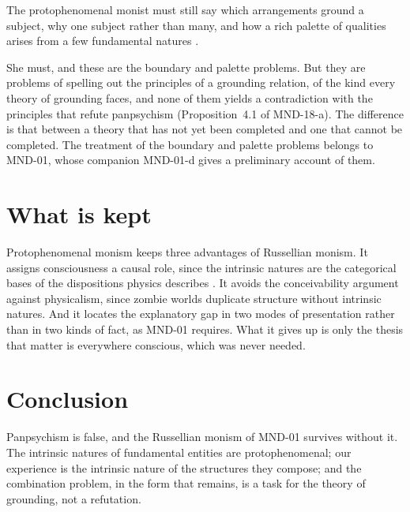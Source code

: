 \documentclass{situationist-preprint}
\begin{document}
\begin{objection}
The protophenomenal monist must still say which arrangements ground a subject, why one subject rather than many, and how a rich palette of qualities arises from a few fundamental natures \citep{Chalmers2017,Coleman2014}.
\end{objection}

\begin{reply}
She must, and these are the boundary and palette problems. But they are problems of spelling out the principles of a grounding relation, of the kind every theory of grounding faces, and none of them yields a contradiction with the principles that refute panpsychism (Proposition~4.1 of MND-18-a). The difference is that between a theory that has not yet been completed and one that cannot be completed. The treatment of the boundary and palette problems belongs to MND-01, whose companion MND-01-d gives a preliminary account of them.
\end{reply}

\section{What is kept}

Protophenomenal monism keeps three advantages of Russellian monism. It assigns consciousness a causal role, since the intrinsic natures are the categorical bases of the dispositions physics describes \citep{Chalmers2013}. It avoids the conceivability argument against physicalism, since zombie worlds duplicate structure without intrinsic natures. And it locates the explanatory gap in two modes of presentation rather than in two kinds of fact, as MND-01 requires. What it gives up is only the thesis that matter is everywhere conscious, which was never needed.

\section{Conclusion}

Panpsychism is false, and the Russellian monism of MND-01 survives without it. The intrinsic natures of fundamental entities are protophenomenal; our experience is the intrinsic nature of the structures they compose; and the combination problem, in the form that remains, is a task for the theory of grounding, not a refutation.
\end{document}
